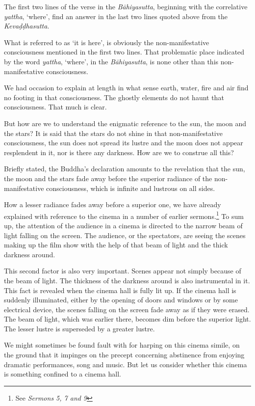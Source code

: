 The first two lines of the verse in the \emph{Bāhiyasutta}, beginning with the correlative \emph{yattha}, `where', find an answer in the last two lines quoted above from the \emph{Kevaḍḍhasutta}.

What is referred to as `it is here', is obviously the non-manifestative consciousness mentioned in the first two lines. That problematic place indicated by the word \emph{yattha}, `where', in the \emph{Bāhiyasutta}, is none other than this non-manifestative consciousness.

We had occasion to explain at length in what sense earth, water, fire and air find no footing in that consciousness. The ghostly elements do not haunt that consciousness. That much is clear.

But how are we to understand the enigmatic reference to the sun, the moon and the stars? It is said that the stars do not shine in that non-manifestative consciousness, the sun does not spread its lustre and the moon does not appear resplendent in it, nor is there any darkness. How are we to construe all this?

Briefly stated, the Buddha's declaration amounts to the revelation that the sun, the moon and the stars fade away before the superior radiance of the non-manifestative consciousness, which is infinite and lustrous on all sides.

How a lesser radiance fades away before a superior one, we have already explained with reference to the cinema in a number of earlier sermons.\footnote{See \emph{Sermons 5, 7 and 9}} To sum up, the attention of the audience in a cinema is directed to the narrow beam of light falling on the screen. The audience, or the spectators, are seeing the scenes making up the film show with the help of that beam of light and the thick darkness around.

This second factor is also very important. Scenes appear not simply because of the beam of light. The thickness of the darkness around is also instrumental in it. This fact is revealed when the cinema hall is fully lit up. If the cinema hall is suddenly illuminated, either by the opening of doors and windows or by some electrical device, the scenes falling on the screen fade away as if they were erased. The beam of light, which was earlier there, becomes dim before the superior light. The lesser lustre is superseded by a greater lustre.

We might sometimes be found fault with for harping on this cinema simile, on the ground that it impinges on the precept concerning abstinence from enjoying dramatic performances, song and music. But let us consider whether this cinema is something confined to a cinema hall.

